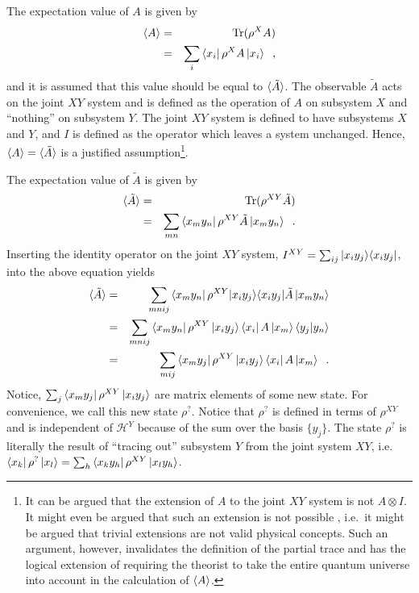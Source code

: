 The expectation value of $A$ is given by
\begin{eqnarray*}
\langle A\rangle &=& \operatorname{Tr}(\rho^X A)\\
&=& \sum_i \left\langle x_i\right|\rho^X A\left|x_i\right\rangle\;\;, 
\end{eqnarray*}
and it is assumed that this value should be equal to $\langle \tilde{A}\rangle$.  The observable $\tilde{A}$ acts on the joint $XY$ system and is defined as the operation of $A$ on subsystem $X$ and ``nothing'' on subsystem $Y$.  The joint $XY$ system is defined to have subsystems $X$ and $Y$, and $I$ is defined as the operator which leaves a system unchanged.  Hence, $\langle A\rangle=\langle \tilde{A}\rangle$ is a justified assumption\footnote{It can be argued that the extension of $A$ to the joint $XY$ system is not $A\otimes I$.  It might even be argued that such an extension is not possible \cite{Gisin2001}, i.e.\ it might be argued that trivial extensions are not valid physical concepts.  Such an argument, however, invalidates the definition of the partial trace and has the logical extension of requiring the theorist to take the entire quantum universe into account in the calculation of $\langle A\rangle$.}.

The expectation value of $\tilde{A}$ is given by
\begin{eqnarray*}
\langle \tilde{A}\rangle &=& \operatorname{Tr}(\rho^{XY} \tilde{A})\\
&=& \sum_{mn} \left\langle x_my_n\right|\rho^{XY} \tilde{A}\left|x_my_n\right\rangle\;\;.
\end{eqnarray*}
Inserting the identity operator on the joint $XY$ system, $I^{XY}=\sum_{ij}|x_iy_j\rangle\langle x_iy_j|$, into the above equation yields
\begin{eqnarray*}
\langle \tilde{A}\rangle &=& \sum_{mnij} \left\langle x_my_n\right|\rho^{XY} |x_iy_j\rangle\langle x_iy_j|\tilde{A}\left|x_my_n\right\rangle\\
&=& \sum_{mnij} \left\langle x_my_n\right|\rho^{XY} \left|x_iy_j\right\rangle \left\langle x_i\right|A\left|x_m\right\rangle\langle y_j|y_n\rangle\\
&=& \sum_{mij} \left\langle x_my_j\right|\rho^{XY} \left|x_iy_j\right\rangle \left\langle x_i\right|A\left|x_m\right\rangle\;\;.
\end{eqnarray*}
Notice, $\sum_j \left\langle x_my_j\right|\rho^{XY} \left|x_iy_j\right\rangle$ are matrix elements of some new state.  For convenience, we call this new state $\rho^?$.  Notice that $\rho^?$ is defined in terms of $\rho^{XY}$ and is independent of $\mathcal{H}^Y$ because of the sum over the basis $\{y_j\}$.  The state $\rho^?$ is literally the result of ``tracing out'' subsystem $Y$ from the joint system $XY$, i.e.\ $\left\langle x_k\right|\rho^?\left|x_l\right\rangle=\sum_h \left\langle x_ky_h\right|\rho^{XY}\left|x_ly_h\right\rangle$.  

